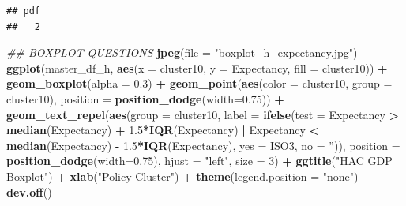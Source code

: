 \documentclass[]{article}
\newenvironment{Shaded}{\begin{snugshade}}{\end{snugshade}}
\newcommand{\CommentTok}[1]{\textcolor[rgb]{0.56,0.35,0.01}{\textit{#1}}}
\newcommand{\DataTypeTok}[1]{\textcolor[rgb]{0.13,0.29,0.53}{#1}}
\newcommand{\DecValTok}[1]{\textcolor[rgb]{0.00,0.00,0.81}{#1}}
\newcommand{\FloatTok}[1]{\textcolor[rgb]{0.00,0.00,0.81}{#1}}
\newcommand{\KeywordTok}[1]{\textcolor[rgb]{0.13,0.29,0.53}{\textbf{#1}}}
\newcommand{\NormalTok}[1]{#1}
\newcommand{\OperatorTok}[1]{\textcolor[rgb]{0.81,0.36,0.00}{\textbf{#1}}}
\newcommand{\StringTok}[1]{\textcolor[rgb]{0.31,0.60,0.02}{#1}}
\begin{document}
\begin{verbatim}
## pdf 
##   2
\end{verbatim}

\begin{Shaded}
\begin{Highlighting}[]
\CommentTok{## BOXPLOT QUESTIONS}
\KeywordTok{jpeg}\NormalTok{(}\DataTypeTok{file =} \StringTok{"boxplot_h_expectancy.jpg"}\NormalTok{)}
\KeywordTok{ggplot}\NormalTok{(master_df_h, }
       \KeywordTok{aes}\NormalTok{(}\DataTypeTok{x =}\NormalTok{ cluster10, }\DataTypeTok{y =}\NormalTok{ Expectancy, }\DataTypeTok{fill =}\NormalTok{ cluster10)) }\OperatorTok{+}
\StringTok{  }\KeywordTok{geom_boxplot}\NormalTok{(}\DataTypeTok{alpha =} \FloatTok{0.3}\NormalTok{) }\OperatorTok{+}
\StringTok{  }\KeywordTok{geom_point}\NormalTok{(}\KeywordTok{aes}\NormalTok{(}\DataTypeTok{color =}\NormalTok{ cluster10, }\DataTypeTok{group =}\NormalTok{ cluster10), }\DataTypeTok{position =} \KeywordTok{position_dodge}\NormalTok{(}\DataTypeTok{width=}\FloatTok{0.75}\NormalTok{)) }\OperatorTok{+}
\StringTok{  }\KeywordTok{geom_text_repel}\NormalTok{(}\KeywordTok{aes}\NormalTok{(}\DataTypeTok{group =}\NormalTok{ cluster10, }
                \DataTypeTok{label =} \KeywordTok{ifelse}\NormalTok{(}\DataTypeTok{test =}\NormalTok{ Expectancy }\OperatorTok{>}\StringTok{ }\KeywordTok{median}\NormalTok{(Expectancy)}
                               \OperatorTok{+}\StringTok{ }\FloatTok{1.5}\OperatorTok{*}\KeywordTok{IQR}\NormalTok{(Expectancy) }\OperatorTok{|}\StringTok{ }\NormalTok{Expectancy }\OperatorTok{<}\StringTok{ }
\StringTok{                                 }\KeywordTok{median}\NormalTok{(Expectancy) }\OperatorTok{-}\StringTok{ }\FloatTok{1.5}\OperatorTok{*}\KeywordTok{IQR}\NormalTok{(Expectancy), }
                  \DataTypeTok{yes =}\NormalTok{ ISO3,}
                  \DataTypeTok{no =} \StringTok{''}\NormalTok{)), }
            \DataTypeTok{position =} \KeywordTok{position_dodge}\NormalTok{(}\DataTypeTok{width=}\FloatTok{0.75}\NormalTok{),}
            \DataTypeTok{hjust =} \StringTok{"left"}\NormalTok{, }\DataTypeTok{size =} \DecValTok{3}\NormalTok{) }\OperatorTok{+}\StringTok{ }\KeywordTok{ggtitle}\NormalTok{(}\StringTok{"HAC GDP Boxplot"}\NormalTok{) }\OperatorTok{+}\StringTok{ }\KeywordTok{xlab}\NormalTok{(}\StringTok{"Policy Cluster"}\NormalTok{) }\OperatorTok{+}\StringTok{ }
\StringTok{  }\KeywordTok{theme}\NormalTok{(}\DataTypeTok{legend.position =} \StringTok{"none"}\NormalTok{)}
\KeywordTok{dev.off}\NormalTok{()}
\end{Highlighting}
\end{Shaded}
\end{document}
